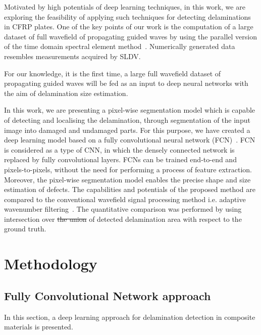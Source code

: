 \documentclass[preprint,9pt]{elsarticle}
\providecommand{\DIFaddtex}[1]{{\protect\color{blue}\uwave{#1}}} %
\providecommand{\DIFdeltex}[1]{{\protect\color{red}\sout{#1}}}                      %
\providecommand{\DIFaddbegin}{} %
\providecommand{\DIFaddend}{} %
\providecommand{\DIFdelbegin}{} %
\providecommand{\DIFdelend}{} %
\providecommand{\DIFadd}[1]{\texorpdfstring{\DIFaddtex{#1}}{#1}} %
\providecommand{\DIFdel}[1]{\texorpdfstring{\DIFdeltex{#1}}{}} %
\newcommand{\DIFscaledelfig}{0.5}
\newlength{\DIFdelgraphicswidth} %
\newlength{\DIFdelgraphicsheight} %
\newcommand{\DIFaddincludegraphics}[2][]{{\color{blue}\fbox{\DIFOincludegraphics[#1]{#2}}}} %
\newcommand{\DIFdelincludegraphics}[2][]{%
\sbox{\DIFdelgraphicsbox}{\DIFOincludegraphics[#1]{#2}}%
\settoboxwidth{\DIFdelgraphicswidth}{\DIFdelgraphicsbox} %
\settoboxtotalheight{\DIFdelgraphicsheight}{\DIFdelgraphicsbox} %
\scalebox{\DIFscaledelfig}{%
\parbox[b]{\DIFdelgraphicswidth}{\usebox{\DIFdelgraphicsbox}\\[-\baselineskip] \rule{\DIFdelgraphicswidth}{0em}}\llap{\resizebox{\DIFdelgraphicswidth}{\DIFdelgraphicsheight}{%
\setlength{\unitlength}{\DIFdelgraphicswidth}%
\begin{picture}(1,1)%
\thicklines\linethickness{2pt} %
{\color[rgb]{1,0,0}\put(0,0){\framebox(1,1){}}}%
{\color[rgb]{1,0,0}\put(0,0){\line( 1,1){1}}}%
{\color[rgb]{1,0,0}\put(0,1){\line(1,-1){1}}}%
\end{picture}%
}\hspace*{3pt}}} %
} %
\DeclareRobustCommand{\DIFaddbegin}{\DIFOaddbegin \let\includegraphics\DIFaddincludegraphics} %
\DeclareRobustCommand{\DIFaddend}{\DIFOaddend \let\includegraphics\DIFOincludegraphics} %
\DeclareRobustCommand{\DIFdelbegin}{\DIFOdelbegin \let\includegraphics\DIFdelincludegraphics} %
\DeclareRobustCommand{\DIFdelend}{\DIFOaddend \let\includegraphics\DIFOincludegraphics} %
\begin{document}
Motivated by high potentials of deep learning techniques, in this work, we are exploring the feasibility of applying such techniques for detecting delaminations in CFRP plates. 
One of the key points of our work is the computation of a large dataset of full wavefield of propagating guided waves by using the parallel version of the time domain spectral element method~\cite{Kudela2020}. 
Numerically generated data resembles measurements acquired by SLDV. 

For our knowledge, it is the first time, a large full wavefield dataset of propagating guided waves will be fed as an input to deep neural networks with the aim of delamination size estimation.

In this work, we are presenting a pixel-wise segmentation model which is capable of detecting and localising the delamination, through segmentation of the input image into damaged and undamaged parts.
For this purpose, we have created a deep learning model based on a fully convolutional neural network (FCN)~\cite{long2015fully}.
FCN is considered as a type of CNN, in which the densely connected network is replaced by fully convolutional layers. 
FCNs can be trained end-to-end and pixels-to-pixels, without the need for performing a process of feature extraction. 
Moreover, the pixel-wise segmentation model enables the precise shape and size estimation of defects.
The capabilities and potentials of the proposed method are compared to the conventional wavefield signal processing method i.e. adaptive wavenumber filtering~\cite{Kudela2015,Radzienski2019a}.
The quantitative comparison was performed by using intersection over \DIFdelbegin \DIFdel{the union }\DIFdelend \DIFaddbegin \DIFadd{union (IoU) }\DIFaddend of detected delamination area with respect to the ground truth. 
\section{Methodology}
\DIFdelbegin %
\DIFdelend \DIFaddbegin 


\DIFaddend %
\subsection{Fully Convolutional Network approach}
In this section, a deep learning approach for delamination detection in composite materials is presented. 
\end{document}
